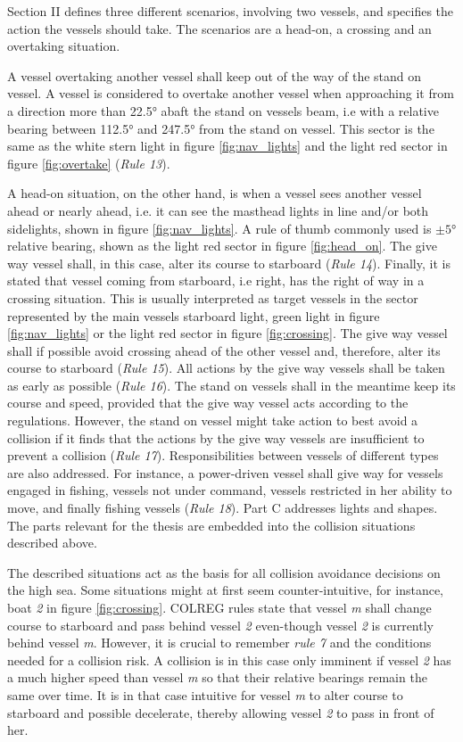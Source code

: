 Section II defines three different scenarios, involving two vessels, and specifies the action the vessels should take.
The scenarios are a head-on, a crossing and an overtaking situation.

A vessel overtaking another vessel shall keep out of the way of the stand on vessel.
A vessel is considered to overtake another vessel when approaching it from a direction more than \ang{22.5} abaft the stand on vessels beam, i.e with a relative bearing between \ang{112.5} and \ang{247.5} from the stand on vessel.
This sector is the same as the white stern light in  figure \ref{fig:nav_lights} and{} the light red sector in figure \ref{fig:overtake} (\textit{Rule 13}).

A head-on situation, on the other hand, is when a vessel sees another vessel ahead or nearly ahead, i.e. it can see the masthead lights in line and/or both sidelights, shown in figure \ref{fig:nav_lights}. A rule of thumb commonly used is $\pm\ang{5}$ relative bearing, shown as the light red sector in figure \ref{fig:head_on}.
The give way vessel shall, in this case, alter its course to starboard (\textit{Rule 14}).
Finally, it is stated that vessel coming from starboard, i.e right, has the right of way in a crossing situation.
This is usually interpreted as target  vessels in the sector represented by the main vessels starboard light, green light in figure \ref{fig:nav_lights} or the light red sector in figure \ref{fig:crossing}.
The give way vessel shall if possible avoid crossing ahead of the other vessel and, therefore, alter its course to starboard  (\textit{Rule 15}).
All actions by the give way vessels shall be taken as early as possible  (\textit{Rule 16}). The stand on vessels shall in the meantime keep its course and speed, provided that the give way vessel acts according to the regulations.
However, the stand on vessel might take action to best avoid a collision if it finds that the actions by the give way vessels are insufficient to prevent a collision  (\textit{Rule 17}).
Responsibilities between vessels of different types are also addressed.
For instance, a power-driven vessel shall give way for vessels engaged in fishing,  vessels not under command,  vessels restricted in her ability to move, and finally fishing vessels   (\textit{Rule 18}).
Part C addresses lights and shapes. The parts relevant for the thesis are embedded into the collision situations described above.

The described situations act as the basis for all collision avoidance decisions on the high sea. Some situations might at first seem counter-intuitive, for instance, boat \textit{2} in figure \ref{fig:crossing}. COLREG rules state that vessel \textit{m} shall change course to starboard and pass behind vessel \textit{2} even-though vessel \textit{2} is currently behind vessel \textit{m}. However, it is crucial to remember \textit{rule 7} and the conditions needed for a collision risk. A collision is in this case only imminent if vessel \textit{2} has a much higher speed than vessel \textit{m} so that their relative bearings remain the same over time. It is in that case intuitive for vessel \textit{m} to alter course to starboard and possible decelerate, thereby allowing vessel \textit{2} to pass in front of her.

